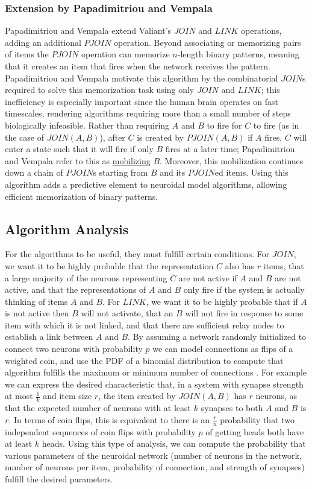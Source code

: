 \documentclass[letterpaper, 12pt]{article}
\begin{document}
\subsubsection{Extension by Papadimitriou and Vempala}\label{sec:pjoin}
Papadimitriou and Vempala \cite{papadimitriou_cortical_2015} extend Valiant's $JOIN$ and $LINK$ operations, adding an additional $PJOIN$ operation. Beyond associating or memorizing pairs of items the $PJOIN$ operation can memorize $n$-length binary patterns, meaning that it creates an item that fires when the network receives the pattern. Papadimitriou and Vempala motivate this algorithm by the combinatorial $JOIN$s required to solve this memorization task using only $JOIN$ and $LINK$; this inefficiency is especially important since the human brain operates on fast timescales, rendering algorithms requiring more than a small number of steps biologically infeasible. Rather than requiring $A$ and $B$ to fire for $C$ to fire (as in the case of $JOIN(A, B)$), after $C$ is created by $PJOIN(A,B)$ if $A$ fires, $C$ will enter a state such that it will fire if only $B$ fires at a later time; Papadimitriou and Vempala refer to this as \underline{mobilizing} $B$. Moreover, this mobilization continues down a chain of $PJOIN$s starting from $B$ and its $PJOIN$ed items. Using this algorithm adds a predictive element to neuroidal model algorithms, allowing efficient memorization of binary patterns.

\subsection{Algorithm Analysis}
For the algorithms to be useful, they must fulfill certain conditions. For $JOIN$, we want it to be highly probable that the representation $C$ also has $r$ items, that a large majority of the neurons representing $C$ are not active if $A$ and $B$ are not active, and that the representations of $A$ and $B$ only fire if the system is actually thinking of items $A$ and $B$. For $LINK$, we want it to be highly probable that if $A$ is not active then $B$ will not activate, that an $B$ will not fire in response to some item with which it is not linked, and that there are sufficient relay nodes to establish a link between $A$ and $B$. By assuming a network randomly initialized to connect two neurons with probability $p$ we can model connections as flips of a weighted coin, and use the PDF of a binomial distribution to compute that algorithm fulfills the maximum or minimum number of connections \cite{valiant_memorization_2005}. For example we can express the desired characteristic that, in a system with synapse strength at most $\frac{1}{k}$ and item size $r$, the item created by $JOIN(A, B)$ has $r$ neurons, as that the expected number of neurons with at least $k$ synapses to both $A$ and $B$ is $r$. In terms of coin flips, this is equivalent to there is an $\frac{r}{n}$ probability that two independent sequences of coin flips with probability $p$ of getting heads both have at least $k$ heads. Using this type of analysis, we can compute the probability that various parameters of the neuroidal network (number of neurons in the network, number of neurons per item, probability of connection, and strength of synapses) fulfill the desired parameters.
\end{document}
